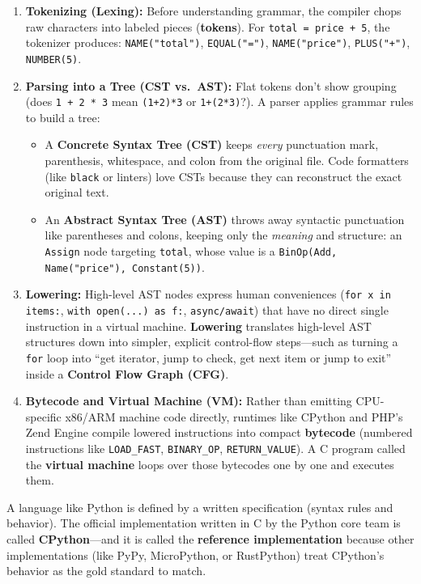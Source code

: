 \begin{enumerate}[leftmargin=15pt]
  \item \textbf{Tokenizing (Lexing):} Before understanding grammar, the compiler chops raw characters into labeled pieces (\textbf{tokens}). For \texttt{total = price + 5}, the tokenizer produces: \texttt{NAME("total")}, \texttt{EQUAL("=")}, \texttt{NAME("price")}, \texttt{PLUS("+")}, \texttt{NUMBER(5)}.
  \item \textbf{Parsing into a Tree (CST vs.\ AST):} Flat tokens don't show grouping (does \texttt{1 + 2 * 3} mean \texttt{(1+2)*3} or \texttt{1+(2*3)}?). A parser applies grammar rules to build a tree:
  \begin{itemize}
    \item A \textbf{Concrete Syntax Tree (CST)} keeps \emph{every} punctuation mark, parenthesis, whitespace, and colon from the original file. Code formatters (like \texttt{black} or linters) love CSTs because they can reconstruct the exact original text.
    \item An \textbf{Abstract Syntax Tree (AST)} throws away syntactic punctuation like parentheses and colons, keeping only the \emph{meaning} and structure: an \texttt{Assign} node targeting \texttt{total}, whose value is a \texttt{BinOp(Add, Name("price"), Constant(5))}.
  \end{itemize}
  \item \textbf{Lowering:} High-level AST nodes express human conveniences (\texttt{for x in items:}, \texttt{with open(...) as f:}, \texttt{async/await}) that have no direct single instruction in a virtual machine. \textbf{Lowering} translates high-level AST structures down into simpler, explicit control-flow steps---such as turning a \texttt{for} loop into ``get iterator, jump to check, get next item or jump to exit'' inside a \textbf{Control Flow Graph (CFG)}.
  \item \textbf{Bytecode and Virtual Machine (VM):} Rather than emitting CPU-specific x86/ARM machine code directly, runtimes like CPython and PHP's Zend Engine compile lowered instructions into compact \textbf{bytecode} (numbered instructions like \texttt{LOAD\_FAST}, \texttt{BINARY\_OP}, \texttt{RETURN\_VALUE}). A C program called the \textbf{virtual machine} loops over those bytecodes one by one and executes them.
\end{enumerate}

A language like Python is defined by a written specification (syntax rules and behavior). The official implementation written in C by the Python core team is called \textbf{CPython}---and it is called the \textbf{reference implementation} because other implementations (like PyPy, MicroPython, or RustPython) treat CPython's behavior as the gold standard to match.

